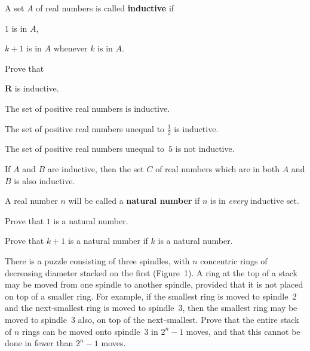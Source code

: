 \begin{letters}
\item A set $A$ of real numbers is called \textbf{inductive} if
\begin{steps}
\item $1$ is in $A$,
\item $k+1$ is in $A$ whenever $k$ is in $A$.
\end{steps}
Prove that
\begin{romans}
\item $\mathbf{R}$ is inductive.
\item The set of positive real numbers is inductive.
\item The set of positive real numbers unequal to $\tfrac12$ is inductive.
\item The set of positive real numbers unequal to~$5$ is not inductive.
\item If $A$ and $B$ are inductive, then the set $C$ of real numbers which
  are in both $A$ and $B$ is also inductive.
\end{romans}
\item A real number $n$ will be called a \textbf{natural number} if $n$ is in
  \emph{every} inductive set.
\begin{romans}
\item Prove that $1$ is a natural number.
\item Prove that $k+1$ is a natural number if $k$ is a natural number.
\end{romans}
\end{letters}

 There is a puzzle consisting of three spindles, with $n$ concentric
rings of decreasing diameter stacked on the first (Figure~1). A ring at the
top of a stack may be moved from one spindle to another spindle, provided
that it is not placed on top of a smaller ring. For example, if the smallest
ring is moved to spindle~2 and the next-smallest ring is moved to spindle~3,
then the smallest ring may be moved to spindle~3 also, on top of the
next-smallest. Prove that the entire stack of $n$ rings can be moved onto
spindle~3 in $2^n - 1$ moves, and that this cannot be done in fewer than
$2^n - 1$ moves.

\begin{center}
\\[0.6em]
\end{center}

